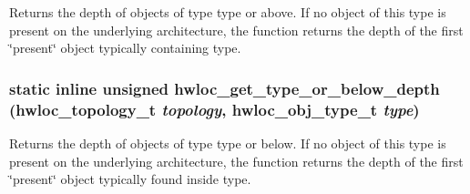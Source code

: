 Returns the depth of objects of type {\ttfamily type} or above. If no object of this type is present on the underlying architecture, the function returns the depth of the first \char`\"{}present\char`\"{} object typically containing {\ttfamily type}. \hypertarget{group__hwlocality__helper__types_gaa0835c86ef2ce8c62637d61a1cf134f9}{
\subsubsection[{hwloc\_\-get\_\-type\_\-or\_\-below\_\-depth}]{\setlength{\rightskip}{0pt plus 5cm}static inline unsigned hwloc\_\-get\_\-type\_\-or\_\-below\_\-depth ({\bf hwloc\_\-topology\_\-t} {\em topology}, \/  {\bf hwloc\_\-obj\_\-type\_\-t} {\em type})}}
\label{group__hwlocality__helper__types_gaa0835c86ef2ce8c62637d61a1cf134f9}


Returns the depth of objects of type {\ttfamily type} or below. If no object of this type is present on the underlying architecture, the function returns the depth of the first \char`\"{}present\char`\"{} object typically found inside {\ttfamily type}. 
